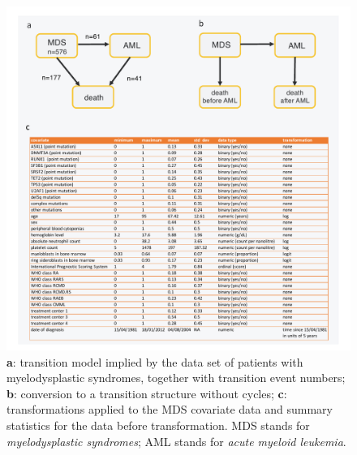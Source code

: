     \begin{figure}[h] 
    \centering         
    \includegraphics[width=14.5cm, angle=0]{figures/data_summary_figs2.pdf} %
    \vspace*{-0.25cm}     %
    \caption{\textbf{a}: transition model implied by the data set of patients with myelodysplastic syndromes, together with transition event numbers; \textbf{b}: conversion to a transition structure without cycles; \textbf{c}: transformations applied to the MDS covariate data and summary statistics for the data before transformation. MDS stands for \textit{myelodysplastic syndromes}; AML stands for \textit{acute myeloid leukemia}.}      
    \label{fig:trans_diagrams} %
    \end{figure} 
    
